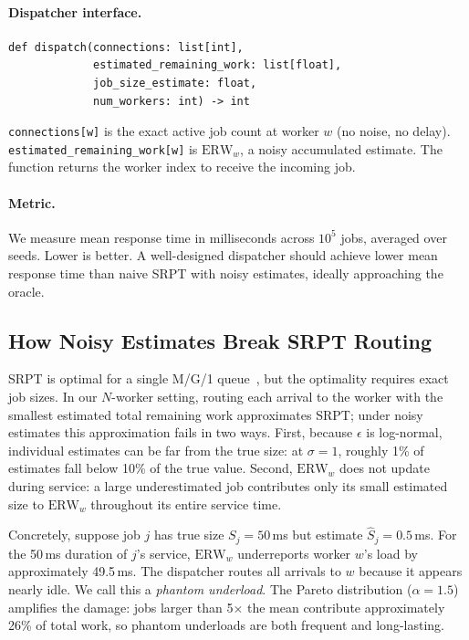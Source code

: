 \documentclass[11pt]{article}
\begin{document}
\paragraph{Dispatcher interface.}
\begin{lstlisting}
def dispatch(connections: list[int],
             estimated_remaining_work: list[float],
             job_size_estimate: float,
             num_workers: int) -> int
\end{lstlisting}
\texttt{connections[w]} is the exact active job count at worker $w$
(no noise, no delay).
\texttt{estimated\_remaining\_work[w]} is $\mathrm{ERW}_w$, a noisy
accumulated estimate.
The function returns the worker index to receive the incoming job.

\paragraph{Metric.}
We measure mean response time in milliseconds across $10^5$ jobs,
averaged over seeds.
Lower is better.
A well-designed dispatcher should achieve lower mean response time
than naive SRPT with noisy estimates, ideally approaching the oracle.

\subsection{How Noisy Estimates Break SRPT Routing}
\label{sec:exp2-math}

SRPT is optimal for a single M/G/1 queue~\citep{schrage1968srpt},
but the optimality requires exact job sizes.
In our $N$-worker setting, routing each arrival to the worker with
the smallest estimated total remaining work approximates SRPT;
under noisy estimates this approximation fails in two ways.
First, because $\epsilon$ is log-normal, individual estimates can be
far from the true size: at $\sigma{=}1$, roughly 1\% of estimates
fall below 10\% of the true value.
Second, $\mathrm{ERW}_w$ does not update during service: a large
underestimated job contributes only its small estimated size to
$\mathrm{ERW}_w$ throughout its entire service time.

Concretely, suppose job $j$ has true size $S_j{=}50$\,ms but estimate
$\hat{S}_j{=}0.5$\,ms.
For the 50\,ms duration of $j$'s service, $\mathrm{ERW}_w$ underreports
worker $w$'s load by approximately 49.5\,ms.
The dispatcher routes all arrivals to $w$ because it appears nearly
idle.
We call this a \emph{phantom underload}.
The Pareto distribution ($\alpha{=}1.5$) amplifies the damage: jobs
larger than 5$\times$ the mean contribute approximately 26\% of total
work, so phantom underloads are both frequent and long-lasting.
\end{document}
